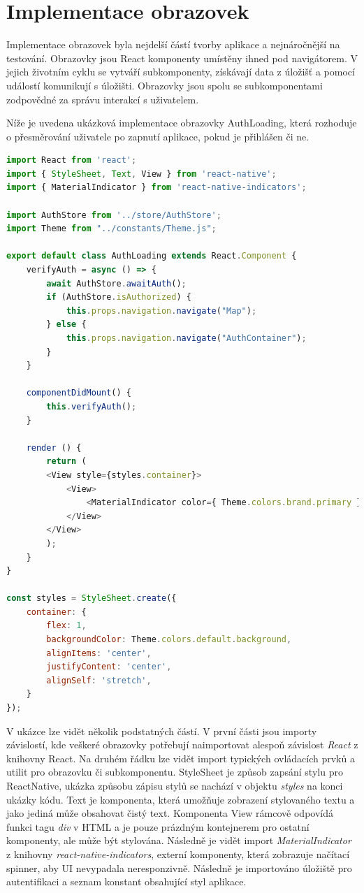 \section{Implementace obrazovek}

Implementace obrazovek byla nejdelší částí tvorby aplikace a nejnáročnější na testování. Obrazovky jsou React komponenty umístěny ihned pod navigátorem. V jejich životním cyklu se vytváří subkomponenty, získávají data z úložišť a pomocí událostí komunikují s úložišti. Obrazovky jsou spolu se subkomponentami zodpovědné za správu interakcí s uživatelem.

Níže je uvedena ukázková implementace obrazovky AuthLoading, která rozhoduje o přesměrování uživatele po zapnutí aplikace, pokud je přihlášen či ne.

\begin{lstlisting}[language=JavaScript, caption=Ukázka implementace obrazovky]
import React from 'react';
import { StyleSheet, Text, View } from 'react-native';
import { MaterialIndicator } from 'react-native-indicators';

import AuthStore from '../store/AuthStore';
import Theme from "../constants/Theme.js";

export default class AuthLoading extends React.Component {
	verifyAuth = async () => {
		await AuthStore.awaitAuth();
		if (AuthStore.isAuthorized) {
			this.props.navigation.navigate("Map");
		} else {
			this.props.navigation.navigate("AuthContainer");
		}
	}
	
	componentDidMount() {
		this.verifyAuth();
	}
	
	render () {
		return (
		<View style={styles.container}>
			<View>
				<MaterialIndicator color={ Theme.colors.brand.primary }/>
			</View>
		</View>
		);
	}
}

const styles = StyleSheet.create({
	container: {
		flex: 1,
		backgroundColor: Theme.colors.default.background,
		alignItems: 'center',
		justifyContent: 'center',
		alignSelf: 'stretch',
	}
});

\end{lstlisting}

V ukázce lze vidět několik podstatných částí. V první části jsou importy závislostí, kde veškeré obrazovky potřebují naimportovat alespoň závislost \emph{React} z knihovny React. Na druhém řádku lze vidět import typických ovládacích prvků a utilit pro obrazovku či subkomponentu. StyleSheet je způsob zapsání stylu pro ReactNative, ukázka způsobu zápisu stylů se nachází v objektu \emph{styles} na konci ukázky kódu. Text je komponenta, která umožňuje zobrazení stylovaného textu a jako jediná může obsahovat čistý text. Komponenta View rámcově odpovídá funkci tagu \emph{div} v HTML a je pouze prázdným kontejnerem pro ostatní komponenty, ale může být stylována. Následně je vidět import \emph{MaterialIndicator} z knihovny \emph{react-native-indicators}, externí komponenty, která zobrazuje načítací spinner, aby UI nevypadala neresponzivně. Následně je importováno úložiště pro autentifikaci a seznam konstant obsahující styl aplikace.

